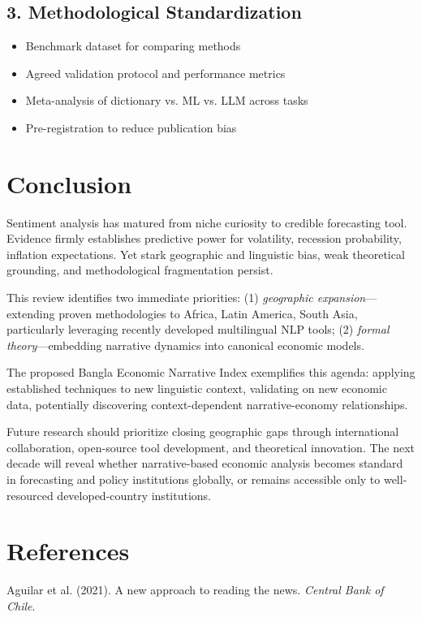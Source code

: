 \documentclass[11pt]{article}
\begin{document}
\subsection{3. Methodological Standardization}

\begin{itemize}
\item Benchmark dataset for comparing methods
\item Agreed validation protocol and performance metrics
\item Meta-analysis of dictionary vs. ML vs. LLM across tasks
\item Pre-registration to reduce publication bias
\end{itemize}

\section{Conclusion}

Sentiment analysis has matured from niche curiosity to credible forecasting tool. Evidence firmly establishes predictive power for volatility, recession probability, inflation expectations. Yet stark geographic and linguistic bias, weak theoretical grounding, and methodological fragmentation persist.

This review identifies two immediate priorities: (1) \textit{geographic expansion}—extending proven methodologies to Africa, Latin America, South Asia, particularly leveraging recently developed multilingual NLP tools; (2) \textit{formal theory}—embedding narrative dynamics into canonical economic models.

The proposed Bangla Economic Narrative Index exemplifies this agenda: applying established techniques to new linguistic context, validating on new economic data, potentially discovering context-dependent narrative-economy relationships.

Future research should prioritize closing geographic gaps through international collaboration, open-source tool development, and theoretical innovation. The next decade will reveal whether narrative-based economic analysis becomes standard in forecasting and policy institutions globally, or remains accessible only to well-resourced developed-country institutions.

\section*{References}

Aguilar et al. (2021). A new approach to reading the news. \textit{Central Bank of Chile}.
\end{document}
